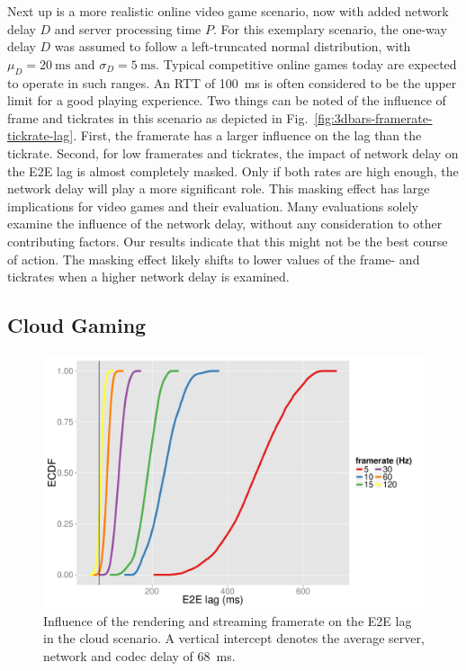Next up is a more realistic online video game scenario, now with added network delay $D$ and server processing time $P$. For this exemplary scenario, the one-way delay $D$ was assumed to follow a left-truncated normal distribution, with $\mu_D = \SI{20}{\milli\second}$ and $\sigma_D = \SI{5}{\milli\second}$. Typical competitive online games today are expected to operate in such ranges. An \acrshort{RTT} of \SI{100}{\milli\second} is often considered to be the upper limit for a good playing experience. Two things can be noted of the influence of frame and tickrates in this scenario as depicted in Fig.~\ref{fig:3dbars-framerate-tickrate-lag}. First, the framerate has a larger influence on the lag than the tickrate. Second, for low framerates and tickrates, the impact of network delay on the \gls{E2E} lag is almost completely masked. Only if both rates are high enough, the network delay will play a more significant role. This masking effect has large implications for video games and their evaluation. Many evaluations solely examine the influence of the network delay, without any consideration to other contributing factors. Our results indicate that this might not be the best course of action. The masking effect likely shifts to lower values of the frame- and tickrates when a higher network delay is examined.



\subsection{Cloud Gaming}

\begin{figure}[!t]
	\centering
	\includegraphics[width=1.0\columnwidth]{../../../simulation/visualization/cloudgaming-lag-cdf.pdf}
	\caption{Influence of the rendering and streaming framerate on the \gls{E2E} lag in the cloud scenario. A vertical intercept denotes the average server, network and codec delay of \SI{68}{\milli\second}.}
\label{fig:cloud-e2e-delay-sim}
\end{figure}

